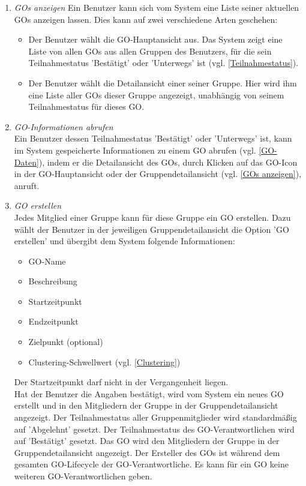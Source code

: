 \documentclass[parskip=full]{scrartcl}
\def\threedigits#1{%
  \ifnum#1<100 0\fi
  \ifnum#1<10 0\fi
  \number#1}
\begin{document}
\begin{enumerate}[label={\textbf{/F\protect\threedigits{\theenumi}0/}}, leftmargin=*, resume]	

	\item \textit{GOs anzeigen}\label{GOs anzeigen} Ein Benutzer kann sich vom System eine Liste seiner aktuellen GOs anzeigen lassen. Dies kann auf zwei verschiedene Arten geschehen:
	\begin{itemize}
		\item Der Benutzer wählt die GO-Hauptansicht aus. Das System zeigt eine Liste von allen GOs aus allen Gruppen des Benutzers, für die sein Teilnahmestatus 'Bestätigt' oder 'Unterwegs' ist (vgl. \ref{Teilnahmestatus}).
		\item Der Benutzer wählt die Detailansicht einer seiner Gruppe. Hier wird ihm eine Liste aller GOs dieser Gruppe angezeigt, unabhängig von seinem Teilnahmestatus für dieses GO.
	\end{itemize}
	
	\item \textit{GO-Informationen abrufen}\label{GO-Informationen abrufen} \\
	Ein Benutzer dessen Teilnahmestatus 'Bestätigt' oder 'Unterwegs' ist, kann im System gespeicherte Informationen zu einem GO abrufen (vgl. \ref{GO-Daten}), indem er die Detailansicht des GOs, durch Klicken auf das GO-Icon in der GO-Hauptansicht oder der Gruppendetailansicht (vgl. \ref{GOs anzeigen}), anruft.

	\item \textit{GO erstellen}\label{GO erstellen} \\
	Jedes Mitglied einer Gruppe kann für diese Gruppe ein GO erstellen. Dazu wählt der Benutzer in der jeweiligen Gruppendetailansicht die Option 'GO erstellen' und übergibt dem System folgende Informationen:
	\begin{itemize}
		\item GO-Name
		\item \colorbox{shadecolor}{Beschreibung}
		\item Startzeitpunkt
		\item Endzeitpunkt 
		\item Zielpunkt (optional)
		\item \colorbox{shadecolor}{Clustering-Schwellwert (vgl. \ref{Clustering})}
	\end{itemize}
Der Startzeitpunkt darf nicht in der Vergangenheit liegen.\\
Hat der Benutzer die Angaben bestätigt, wird vom System ein neues GO erstellt und in den Mitgliedern der Gruppe in der Gruppendetailansicht angezeigt. Der Teilnahmestatus aller Gruppenmitglieder wird standardmäßig auf 'Abgelehnt' gesetzt. Der Teilnahmestatus des GO-Verantwortlichen wird auf 'Bestätigt' gesetzt.
Das GO wird den Mitgliedern der Gruppe in der Gruppendetailansicht angezeigt.
Der Ersteller des GOs ist während dem gesamten \gls{GO-Lifecycle} der GO-Verantwortliche. Es kann für ein GO keine weiteren GO-Verantwortlichen geben.
	

\end{enumerate}
\end{document}
